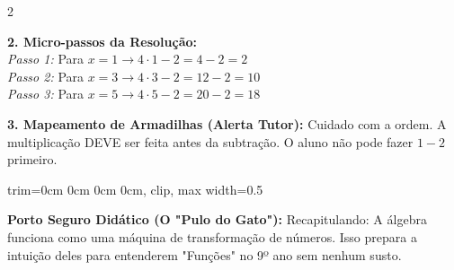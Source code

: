 \begin{multicols*}{2}
\begin{tcolorbox}[colback=CorTitUm!5, colframe=CorTitUm, boxrule=1pt, arc=4pt, left=6pt, right=6pt, top=6pt, bottom=6pt]
    \textbf{2. Micro-passos da Resolução:}\\
    \textit{Passo 1:} Para $x = 1 \rightarrow 4 \cdot 1 - 2 = 4 - 2 = 2$\\
    \textit{Passo 2:} Para $x = 3 \rightarrow 4 \cdot 3 - 2 = 12 - 2 = 10$\\
    \textit{Passo 3:} Para $x = 5 \rightarrow 4 \cdot 5 - 2 = 20 - 2 = 18$\par\vspace{0.1cm}
    
    \textbf{3. Mapeamento de Armadilhas (Alerta Tutor):} Cuidado com a ordem. A multiplicação DEVE ser feita antes da subtração. O aluno não pode fazer $1-2$ primeiro.
    
    \begin{center}
    \begin{adjustbox}{trim=0cm 0cm 0cm 0cm, clip, max width=0.5\linewidth}
    \end{adjustbox}
    \end{center}
    \end{tcolorbox}
    \vspace{0.15cm}
    
    \begin{boxexplicacao}
    \textbf{Porto Seguro Didático (O "Pulo do Gato"):} Recapitulando: A álgebra funciona como uma máquina de transformação de números. Isso prepara a intuição deles para entenderem "Funções" no 9º ano sem nenhum susto.
    \end{boxexplicacao}
\fi


\end{multicols*}
